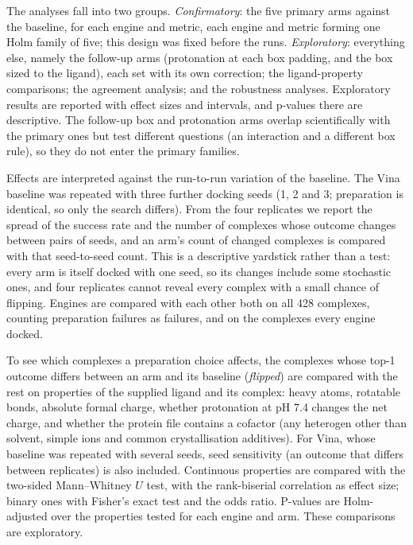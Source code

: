 The analyses fall into two groups. \emph{Confirmatory}: the five primary arms against the
baseline, for each engine and metric, each engine and metric forming one Holm family of
five; this design was fixed before the runs. \emph{Exploratory}: everything else, namely the
follow-up arms (protonation at each box padding, and the box sized to the ligand), each set
with its own correction; the ligand-property comparisons; the agreement analysis; and the
robustness analyses. Exploratory results are reported with effect sizes and intervals, and
p-values there are descriptive. The follow-up box and protonation arms overlap scientifically
with the primary ones but test different questions (an interaction and a different box
rule), so they do not enter the primary families.

Effects are interpreted against the run-to-run variation of the baseline. The Vina baseline
was repeated with three further docking seeds (1, 2 and 3; preparation is identical, so only
the search differs). From the four replicates we report the spread of the success rate and
the number of complexes whose outcome changes between pairs of seeds, and an arm's count of
changed complexes is compared with that seed-to-seed count. This is a descriptive yardstick
rather than a test: every arm is itself docked with one seed, so its changes include some
stochastic ones, and four replicates cannot reveal every complex with a small chance of
flipping. Engines are compared with each other both on all 428 complexes, counting preparation
failures as failures, and on the complexes every engine docked.

To see which complexes a preparation choice affects, the complexes whose top-1 outcome
differs between an arm and its baseline (\emph{flipped}) are compared with the rest on
properties of the supplied ligand and its complex: heavy atoms, rotatable bonds,
absolute formal charge, whether protonation at pH 7.4 changes the net charge, and whether
the protein file contains a cofactor (any heterogen other than solvent, simple ions and
common crystallisation additives). For Vina, whose baseline was repeated with several
seeds, seed sensitivity (an outcome that differs between replicates) is also included.
Continuous properties are compared with the two-sided Mann--Whitney $U$ test, with the
rank-biserial correlation as effect size; binary ones with Fisher's exact test and the
odds ratio. P-values are Holm-adjusted over the properties tested for each engine and
arm. These comparisons are exploratory.

